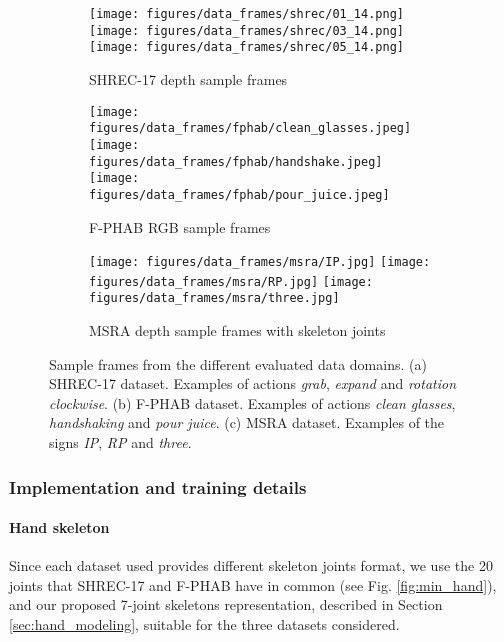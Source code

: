 \documentclass[letterpaper, 10 pt, conference]{ieeeconf}
\begin{document}
\begin{figure}[!bt] \label{fig:frame_samples}
\centering


\begin{subfigure}[b]{\linewidth} 
\centering
    \texttt{[image: figures/data\_frames/shrec/01\_14.png]}
    \texttt{[image: figures/data\_frames/shrec/03\_14.png]}
    \texttt{[image: figures/data\_frames/shrec/05\_14.png]}
\caption{SHREC-17 depth sample frames}
\end{subfigure}
\begin{subfigure}[b]{\linewidth} 
\centering
\texttt{[image: figures/data\_frames/fphab/clean\_glasses.jpeg]}
    \texttt{[image: figures/data\_frames/fphab/handshake.jpeg]}
    \texttt{[image: figures/data\_frames/fphab/pour\_juice.jpeg]}
    \caption{F-PHAB RGB sample frames}
\end{subfigure}
\begin{subfigure}[b]{\linewidth} 
\centering
    \texttt{[image: figures/data\_frames/msra/IP.jpg]}
    \texttt{[image: figures/data\_frames/msra/RP.jpg]}
    \texttt{[image: figures/data\_frames/msra/three.jpg]}
    \caption{MSRA depth sample frames with skeleton joints}
\end{subfigure}
    \caption{Sample frames from the different evaluated data domains. (a) SHREC-17 dataset. Examples of actions \textit{grab}, \textit{expand} and \textit{rotation clockwise}. (b) F-PHAB dataset. Examples of actions \textit{clean glasses}, \textit{handshaking} and \textit{pour juice}. (c) MSRA dataset. Examples of the signs \textit{IP}, \textit{RP} and \textit{three}.}
    \label{fig:frame_samples}
\end{figure}





\subsubsection{Implementation and training details}
\paragraph*{Hand skeleton}
Since each dataset used provides different skeleton joints format, we use the 20 joints that SHREC-17 and F-PHAB have in common (see Fig. \ref{fig:min_hand}), and our proposed 7-joint skeletons representation, described in Section \ref{sec:hand_modeling}, suitable for the three datasets considered.
\end{document}
